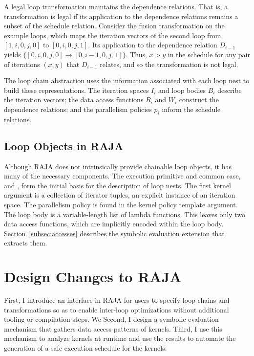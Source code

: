 A legal loop transformation maintains the dependence relations. 
That is, a transformation is legal if its application to the dependence
relations remains a subset of the schedule relation.
Consider the fusion transformation on the example loops, which maps the
iteration vectors of the second loop from $[1,i,0,j,0]$ to $[0,i,0,j,1]$. 
Its application to the dependence relation $D_{i-1}$ yields
$\{[0,i,0,j,0] \to [0,i-1,0,j,1]\}$.
Thus, $x > y$ in the schedule for any pair of iterations $(x,y)$ that
$D_{i-1}$ relates, and so the transformation is not legal.

The loop chain abstraction uses the information associated with each loop 
nest to build these representations.
The iteration spaces $I_{i}$ and loop bodies $B_{i}$ describe the iteration
vectors; the data access functions $R_{i}$ and $W_{i}$ construct the
dependence relations; and the parallelism policies $p_{i}$ inform the
schedule relations.


\subsection{Loop Objects in RAJA}

Although RAJA does not intrinsically provide chainable loop objects, it has many
of the necessary components.
The execution primitive and common case,  and  , form
the initial basis for the description of loop nests.
The first kernel argument is a collection of iterator tuples, an explicit
instance of an iteration space.
The parallelism policy is found in the kernel policy template argument.
The loop body is a variable-length list of lambda functions.
This leaves only two data access functions, which are implicitly encoded
within the loop body.
Section~\ref{subsec:accesses} describes the symbolic evaluation extension
that extracts them.

\section{Design Changes to RAJA}

First, I introduce an interface in RAJA for users to specify loop chains and transformations
so as to enable inter-loop optimizations without additional tooling or compilation steps.
We
Second, I design a symbolic evaluation mechanism that gathers data access patterns of
kernels.
Third, I use this mechanism to analyze kernels at runtime and use the results to automate the generation of a safe execution schedule for the kernels.


